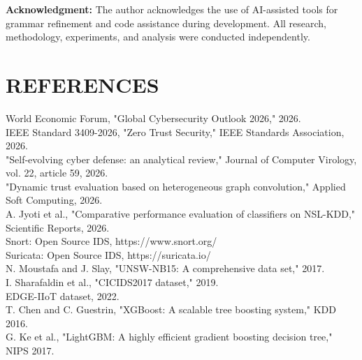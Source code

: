 \documentclass[12pt]{article}
\begin{document}
\vspace{4pt}

\noindent\textbf{Acknowledgment:} The author acknowledges the use of AI-assisted tools for grammar refinement and code assistance during development. All research, methodology, experiments, and analysis were conducted independently.

\newpage

\section*{REFERENCES}

\noindent
[1] World Economic Forum, "Global Cybersecurity Outlook 2026," 2026.\\

\noindent
[2] IEEE Standard 3409-2026, "Zero Trust Security," IEEE Standards Association, 2026.\\

\noindent
[3] "Self-evolving cyber defense: an analytical review," Journal of Computer Virology, vol. 22, article 59, 2026.\\

\noindent
[4] "Dynamic trust evaluation based on heterogeneous graph convolution," Applied Soft Computing, 2026.\\

\noindent
[5] A. Jyoti et al., "Comparative performance evaluation of classifiers on NSL-KDD," Scientific Reports, 2026.\\

\noindent
[6] Snort: Open Source IDS, https://www.snort.org/\\

\noindent
[7] Suricata: Open Source IDS, https://suricata.io/\\

\noindent
[8] N. Moustafa and J. Slay, "UNSW-NB15: A comprehensive data set," 2017.\\

\noindent
[9] I. Sharafaldin et al., "CICIDS2017 dataset," 2019.\\

\noindent
[10] EDGE-IIoT dataset, 2022.\\

\noindent
[11] T. Chen and C. Guestrin, "XGBoost: A scalable tree boosting system," KDD 2016.\\

\noindent
[12] G. Ke et al., "LightGBM: A highly efficient gradient boosting decision tree," NIPS 2017.\\
\end{document}
